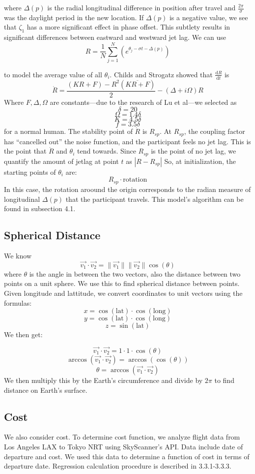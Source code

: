 where $\Delta(p)$ is the radial longitudinal difference in position after travel and $\frac{2\pi}{\sigma}$ was the daylight period in the new location. 
If $\Delta(p)$ is a negative value, we see that $\zeta_1$ has a more significant effect in phase offset. This subtlety results in significant differences between eastward and westward jet lag. 
We can use
$$R = \frac{1}{N} \sum_{j=1}^N (e^{\theta_j - \sigma t - \Delta(p)})$$

to model the average value of all $\theta_i$. Childs and Strogatz showed that $\frac{\mathrm{d} R}{\mathrm{d} t}$ is 
$$\dot{R} = \frac{(KR + F) - R^2(\overline{KR + F})}{2} - (\Delta + i\Omega)R$$
Where $F, \Delta, \Omega$ are constants---due to the research of Lu et al---we selected as 
$$\delta = 20$$
$$\Omega = 1.4 \delta$$
$$K = 4.5 \delta$$
$$f = 3.5 \delta$$
for a normal human.
The stability point of $\dot{R}$ is $R_{sp}$.
At $R_{sp}$, the coupling factor has ``cancelled out'' the noise function, and the participant feels no jet lag. This is the point that $\dot{R}$ and $\theta_i$ tend towards.
Since $R_{sp}$ is the point of no jet lag, we quantify the amount of jetlag at point $t$ as $|R - R_{sp}|$
So, at initialization, the starting points of $\theta_i$ are:
$$R_{sp} \cdot \mathrm{rotation}$$
In this case, the rotation aroound the origin corresponds to the radian measure of longitudinal $\Delta(p)$ that the participant travels. 
This model's algorithm can be found in subsection 4.1.
\subsection{Spherical Distance}
We know
$$\vec{v_1} \cdot \vec{v_2} = \|\vec{v_1}\| \|\vec{v_2}\| \cos(\theta)$$
where $\theta$ is the angle in between the two vectors, also the distance between two points on a unit sphere. We use this to find spherical distance between points. Given longitude and lattitude, we convert coordinates to unit vectors using the formulas:
$$x = \cos(\mathrm{lat}) \cdot \cos(\mathrm{long})$$
$$y = \cos(\mathrm{lat}) \cdot \cos(\mathrm{long})$$
$$z = \sin(\mathrm{lat})$$
We then get:

$$\vec{v_1} \cdot \vec{v_2} = 1 \cdot 1 \cdot \cos(\theta)$$
$$\arccos({\vec{v_1} \cdot \vec{v_2}}) = \arccos(\cos(\theta))$$
$$\theta = \arccos(\vec{v_1} \cdot \vec{v_2})$$
We then multiply this by the Earth's circumference and divide by $2 \pi$ to find distance on Earth's surface.

\subsection{Cost}
We also consider cost. To determine cost function, we analyze flight data from Los Angeles LAX to Tokyo NRT using SkyScanner's API. Data include date of departure and cost. We used this data to determine a function of cost in terms of departure date. Regression calculation procedure is described in 3.3.1-3.3.3.




